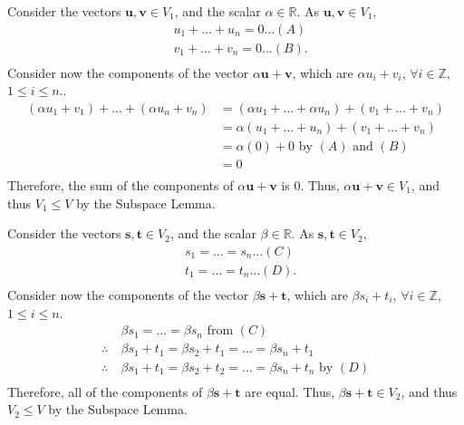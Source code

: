 \documentclass[a4paper,11pt]{article}
\newcommand{\ds}{\displaystyle}
\begin{document}
Consider the vectors $\ds{\mathbf{u}, \mathbf{v} \in V_1}$, and the scalar $\ds{\alpha \in \mathbb{R}}$. As $\ds{\mathbf{u}, \mathbf{v} \in V_1}$,
	\begin{align*}
		& u_1 + \dots + u_n = 0 \dots (A)\\
		& v_1 + \dots + v_n = 0\dots (B).\\
	\end{align*}
Consider now the components of the vector $\ds{\alpha\mathbf{u} + \mathbf{v}}$, which are $\ds{\alpha u_i + v_i}$, $\ds{\forall i \in \mathbb{Z}}$, $\ds{1 \leq i \leq n}$.. 
	\begin{align*}
		(\alpha u_1 + v_1) + \dots + (\alpha u_n + v_n) & = (\alpha u_1 + \dots + \alpha u_n) + (v_1 + \dots + v_n)\\
														& = \alpha(u_1 + \dots + u_n) + (v_1 + \dots + v_n)\\
														& = \alpha(0) + 0 \text{ by } (A) \text{ and } (B)\\
														& = 0\\
	\end{align*}
Therefore, the sum of the components of $\ds{\alpha\mathbf{u} + \mathbf{v}}$ is $\ds{0}$. Thus, $\ds{\alpha\mathbf{u} + \mathbf{v} \in V_1}$, and thus $\ds{V_1 \leq V}$ by the Subspace Lemma.

Consider the vectors $\ds{\mathbf{s}, \mathbf{t} \in V_2}$, and the scalar $\ds{\beta \in \mathbb{R}}$. As $\ds{\mathbf{s}, \mathbf{t} \in V_2}$,
	\begin{align*}
		& s_1 = \dots = s_n \dots (C)\\
		& t_1 = \dots = t_n \dots (D).\\
	\end{align*}
	Consider now the components of the vector $\ds{\beta\mathbf{s} + \mathbf{t}}$, which are $\ds{\beta s_i + t_i}$, $\ds{\forall i \in \mathbb{Z}}$, $\ds{1 \leq i \leq n}$. 
	\begin{align*}
		\:& \beta s_1 = \dots = \beta s_n \text{ from } (C)\\
		\therefore \:& \beta s_1 + t_1 = \beta s_2 + t_1 = \dots = \beta s_n + t_1\\
		\therefore \:& \beta s_1 + t_1 = \beta s_2 + t_2 = \dots = \beta s_n + t_n \text{ by } (D)\\ 
	\end{align*}
Therefore, all of the components of $\ds{\beta\mathbf{s} + \mathbf{t}}$ are equal. Thus, $\ds{\beta\mathbf{s} + \mathbf{t} \in V_2}$, and thus $\ds{V_2 \leq V}$ by the Subspace Lemma.
\end{document}
